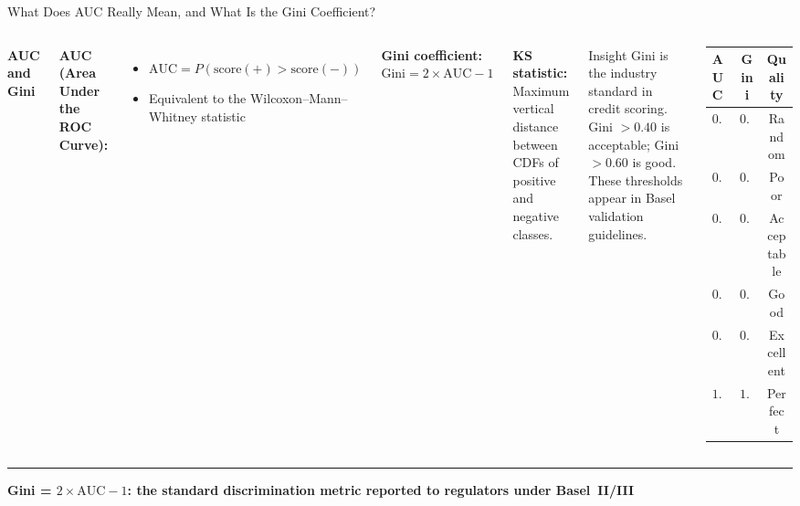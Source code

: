 \documentclass[8pt,aspectratio=169]{beamer}
\newcommand{\bottomnote}[1]{%
\vfill
\vspace{-2mm}
\textcolor{mllavender2}{\rule{\textwidth}{0.4pt}}
\vspace{1mm}
\footnotesize
\textbf{#1}
}
\newenvironment{compactlist}{%
  \begin{itemize}%
    \setlength{\itemsep}{2pt}%
    \setlength{\parskip}{0pt}%
    \setlength{\parsep}{0pt}%
}{%
  \end{itemize}%
}
\begin{document}
\begin{frame}[t]{What Does AUC Really Mean, and What Is the Gini Coefficient?}
\begin{columns}[T]
\small
\textbf{AUC and Gini}

\scriptsize
\textbf{AUC (Area Under the ROC Curve):}
\begin{compactlist}
\item $\text{AUC} = P(\text{score}(+) > \text{score}(-))$
\item Equivalent to the Wilcoxon--Mann--Whitney statistic
\end{compactlist}

\vspace{2mm}
\textbf{Gini coefficient:}
$\displaystyle \text{Gini} = 2 \times \text{AUC} - 1$

\vspace{2mm}
\textbf{KS statistic:} Maximum vertical distance between CDFs of positive and negative classes.

\begin{block}{Insight}
\scriptsize Gini is the industry standard in credit scoring. Gini $> 0.40$ is acceptable; Gini $> 0.60$ is good. These thresholds appear in Basel validation guidelines.
\end{block}

\footnotesize
\vspace{2mm}
\begin{tabular}{@{}l c c@{}}
\toprule
\textbf{AUC} & \textbf{Gini} & \textbf{Quality} \\
\midrule
\rowcolor{mllavender4}
$0.50$ & $0.00$ & Random \\
$0.60$ & $0.20$ & Poor \\
\rowcolor{mllavender4}
$0.70$ & $0.40$ & Acceptable \\
$0.80$ & $0.60$ & Good \\
\rowcolor{mllavender4}
$0.90$ & $0.80$ & Excellent \\
$1.00$ & $1.00$ & Perfect \\
\bottomrule
\end{tabular}

\vspace{3mm}
\end{columns}

\bottomnote{Gini = $2 \times \text{AUC} - 1$: the standard discrimination metric reported to regulators under Basel~II/III}
\end{frame}
\end{document}
